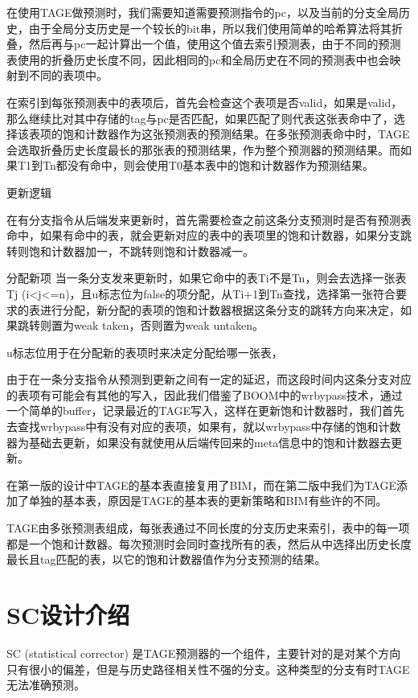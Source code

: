 在使用TAGE做预测时，我们需要知道需要预测指令的pc，以及当前的分支全局历史，由于全局分支历史是一个较长的bit串，所以我们使用简单的哈希算法将其折叠，然后再与pc一起计算出一个值，使用这个值去索引预测表，由于不同的预测表使用的折叠历史长度不同，因此相同的pc和全局历史在不同的预测表中也会映射到不同的表项中。

在索引到每张预测表中的表项后，首先会检查这个表项是否valid，如果是valid，那么继续比对其中存储的tag与pc是否匹配，如果匹配了则代表这张表命中了，选择该表项的饱和计数器作为这张预测表的预测结果。在多张预测表命中时，TAGE会选取折叠历史长度最长的那张表的预测结果，作为整个预测器的预测结果。而如果T1到Tn都没有命中，则会使用T0基本表中的饱和计数器作为预测结果。

更新逻辑

在有分支指令从后端发来更新时，首先需要检查之前这条分支预测时是否有预测表命中，如果有命中的表，就会更新对应的表中的表项里的饱和计数器，如果分支跳转则饱和计数器加一，不跳转则饱和计数器减一。

分配新项
当一条分支发来更新时，如果它命中的表Ti不是Tn，则会去选择一张表Tj (i<j<=n)，且u标志位为false的项分配，从Ti+1到Tn查找，选择第一张符合要求的表进行分配，新分配的表项的饱和计数器根据这条分支的跳转方向来决定，如果跳转则置为weak taken，否则置为weak untaken。

u标志位用于在分配新的表项时来决定分配给哪一张表，

由于在一条分支指令从预测到更新之间有一定的延迟，而这段时间内这条分支对应的表项有可能会有其他的写入，因此我们借鉴了BOOM中的wrbypass技术，通过一个简单的buffer，记录最近的TAGE写入，这样在更新饱和计数器时，我们首先去查找wrbypass中有没有对应的表项，如果有，就以wrbypass中存储的饱和计数器为基础去更新，如果没有就使用从后端传回来的meta信息中的饱和计数器去更新。

在第一版的设计中TAGE的基本表直接复用了BIM，而在第二版中我们为TAGE添加了单独的基本表，原因是TAGE的基本表的更新策略和BIM有些许的不同。

TAGE由多张预测表组成，每张表通过不同长度的分支历史来索引，表中的每一项都是一个饱和计数器。每次预测时会同时查找所有的表，然后从中选择出历史长度最长且tag匹配的表，以它的饱和计数器值作为分支预测的结果。

\section{SC设计介绍}

SC (statistical corrector) 是TAGE预测器的一个组件，主要针对的是对某个方向只有很小的偏差，但是与历史路径相关性不强的分支\cite{tage-sc-l}。这种类型的分支有时TAGE无法准确预测。

